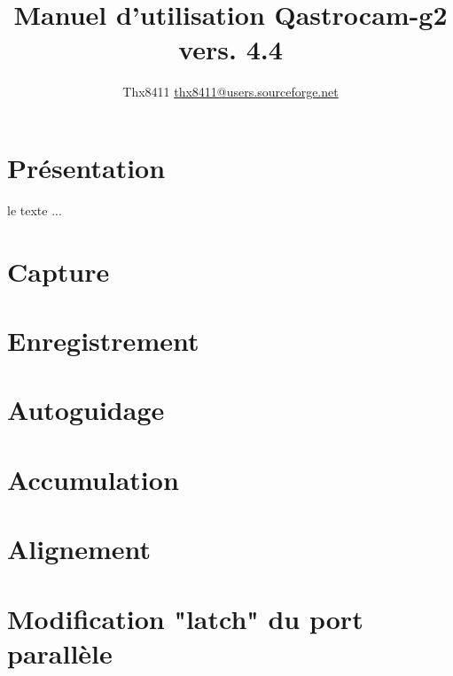 \documentclass[11pt,twoside,a4paper]{book}
\title{Manuel d'utilisation Qastrocam-g2 vers. 4.4}
\author{Thx8411 \url{thx8411@users.sourceforge.net}}
\begin{document}
\maketitle
\tableofcontents

\chapter{Pr\'esentation}

 le texte ...

\chapter{Capture}

\chapter{Enregistrement}

\chapter{Autoguidage}

\chapter{Accumulation}

\chapter{Alignement}

\appendix
\chapter{Modification "latch" du port parall\`ele}
\end{document}
